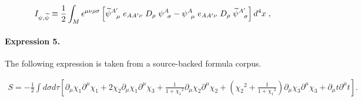 \documentclass[11pt]{article}
\begin{document}
\begin{align*}I_{\psi,{\widetilde \psi}} \equiv {1\over 2}\int_{M} \epsilon^{\mu \nu \rho \sigma} \left[{\widetilde \psi}_{\; \; \; \mu}^{A'} \;e_{AA' \nu} \; D_{\rho} \; \psi_{\; \; \sigma}^{A}-\psi_{\; \; \mu}^{A} \; e_{AA' \nu} \; D_{\rho} \;{\widetilde \psi}_{\; \; \; \sigma}^{A'} \right] d^{4}x \; ,\end{align*}

\paragraph{Expression 5.} The following expression is taken from a source-backed formula corpus.

\begin{align*}S = -\frac{1}{2}\int\!d\sigma d\tau[\partial_\mu\chi_1 \partial^\mu\chi_1 + 2\chi_2\partial_\mu\chi_1 \partial^\mu\chi_3 + \frac{1}{1+{\chi_1}^2}\partial_\mu\chi_2 \partial^\mu\chi_2 + ({\chi_2}^2+\frac{1}{1+{\chi_1}^2})\partial_\mu\chi_3 \partial^\mu\chi_3 +\partial_\mu t \partial^\mu t].\end{align*}
\end{document}
